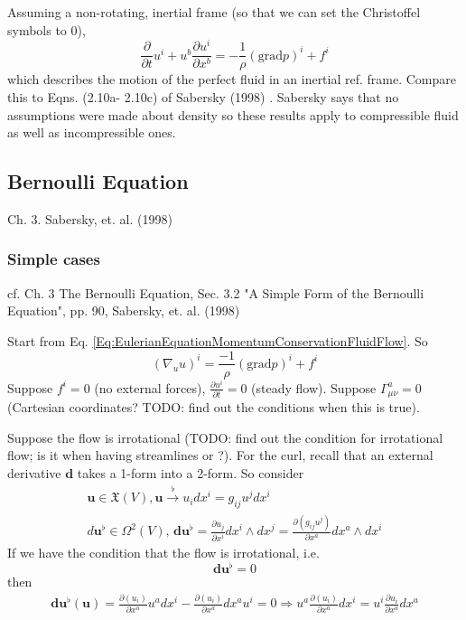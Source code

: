\documentclass[twoside,landscape,10pt]{amsart}
\theoremstyle{plain}
\theoremstyle{definition}
\theoremstyle{remark}
\theoremstyle{remark}
\begin{document}
\begin{multicols*}{2}
Assuming a non-rotating, inertial frame (so that we can set the Christoffel symbols to 0),
\begin{equation}\label{Eq:EulerianEquationMomentumConservationFluidFlowInertialFrame}
\frac{\partial}{\partial t} u^i + u^b \frac{\partial u^i}{\partial x^b} = - \frac{1}{\rho}(\text{grad}p)^i + f^i
\end{equation}
which describes the motion of the perfect fluid in an inertial ref. frame. Compare this to Eqns. (2.10a- 2.10c) of Sabersky (1998) \cite{SAHG1998}. Sabersky says that no assumptions were made about density so these results apply to compressible fluid as well as incompressible ones.


\subsection{Bernoulli Equation}

Ch. 3. Sabersky, et. al. (1998) \cite{SAHG1998}

\subsubsection{Simple cases}

cf. Ch. 3 The Bernoulli Equation, Sec. 3.2 "A Simple Form of the Bernoulli Equation", pp. 90, Sabersky, et. al. (1998) \cite{SAHG1998}


Start from Eq. \ref{Eq:EulerianEquationMomentumConservationFluidFlow}. So
\[
(\nabla_u u)^i = \frac{-1}{\rho} (\text{grad}p)^i + f^i
\]
Suppose $f^i=0$ (no external forces), $\frac{\partial u^i}{\partial t} = 0$ (steady flow). Suppose $\Gamma^a_{\mu \nu} =0$ (Cartesian coordinates? TODO: find out the conditions when this is true).

Suppose the flow is irrotational (TODO: find out the condition for irrotational flow; is it when having streamlines or ?). For the curl, recall that an external derivative $\mathbf{d}$ takes a 1-form into a 2-form. So consider
\[
\begin{gathered}
\mathbf{u} \in \mathfrak{X}(V), \mathbf{u} \xrightarrow{\flat} u_i dx^i = g_{ij} u^j dx^i \\ 
d\mathbf{u}^{\flat} \in \Omega^2(V), \, \mathbf{d}\mathbf{u}^{\flat} = \frac{\partial u_j}{\partial x^i} dx^i \wedge dx^j = \frac{ \partial (g_{ij} u^j) }{\partial x^a} dx^a \wedge dx^i
\end{gathered}
\]
If we have the condition that the flow is irrotational, i.e. 
\begin{equation}
\mathbf{d}\mathbf{u}^{\flat} = 0
\end{equation}
then
\[
\begin{gathered}
\mathbf{d}\mathbf{u}^{\flat} (\mathbf{u}) = \frac{\partial (u_i) }{ \partial x^a} u^a dx^i - \frac{\partial (u_i) }{ \partial x^a} dx^a u^i = 0 \Longrightarrow u^a \frac{ \partial (u_i) }{ \partial x^a} dx^i = u^i \frac{\partial u_i}{ \partial x^a} dx^a
\end{gathered}
\]


\end{multicols*}
\end{document}
